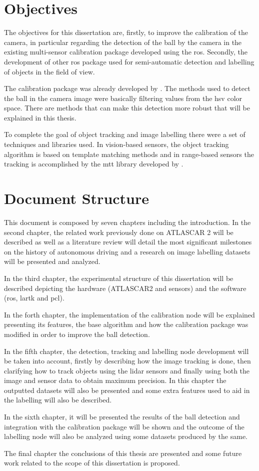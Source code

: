\section{Objectives}
The objectives for this dissertation are, firstly, to improve the calibration of the camera, in particular regarding the detection of the ball by the camera in the existing multi-sensor calibration package developed using the \gls{ros}. Secondly, the development of other \gls{ros} package used for semi-automatic detection and labelling of objects in the field of view.

The calibration package was already developed by \cite{VieiradaSilva2016}. The methods used to detect the ball in the camera image were basically filtering values from the \gls{hsv} color space. There are methods that can make this detection more robust that will be explained in this thesis. 

To complete the goal of object tracking and image labelling there were a set of techniques and libraries used. In vision-based sensors, the object tracking algorithm is based on template matching methods and in range-based sensors the tracking is accomplished by the \gls{mtt} library developed by \cite{SoaresDeAlmeida2016a}.

\section{Document Structure}

This document is composed by seven chapters including the introduction. In the second chapter, the related work previously done on ATLASCAR 2 will be described as well as a literature review will detail the most significant milestones on the history of autonomous driving and a research on image labelling datasets will be presented and analyzed. 

In the third chapter, the experimental structure of this dissertation will be described depicting the hardware (ATLASCAR2 and sensors) and the software (\gls{ros}, \gls{lartk} and \gls{pcl}). 

In the forth chapter, the implementation of the calibration node will be explained presenting its features, the base algorithm and how the calibration package was modified in order to improve the ball detection. 

In the fifth chapter, the detection, tracking and labelling node development will be taken into account, firstly by describing how the image tracking is done, then clarifying how to track objects using the \gls{lidar} sensors and finally using both the image and sensor data to obtain maximum precision. In this chapter the outputted datasets will also be presented and some extra features used to aid in the labelling will also be described. 

In the sixth chapter, it will be presented the results of the ball detection and integration with the calibration package will be shown and the outcome of the labelling node will also be analyzed using some datasets produced by the same. 

The final chapter the conclusions of this thesis are presented and some future work related to the scope of this dissertation is proposed.

